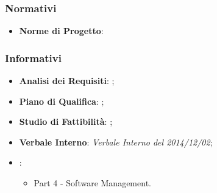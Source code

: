 		\subsubsection{Normativi}
			\begin{itemize}
				\item \textbf{Norme di Progetto}: \docNameVersionNdP
			\end{itemize}	
		\subsubsection{Informativi}
			\begin{itemize}
				\item \textbf{Analisi dei Requisiti}: \docNameVersionAdR;
				\item \textbf{Piano di Qualifica}: \docNameVersionPdQ;
				\item \textbf{Studio di Fattibilità}: \docNameVersionSdF;
				\item \textbf{Verbale Interno}: \emph{Verbale Interno del 2014/12/02};
				\item \textbf{\sommerville}:
					\begin{itemize}
						\item Part 4 - Software Management.					
					\end{itemize}
			\end{itemize}
			
